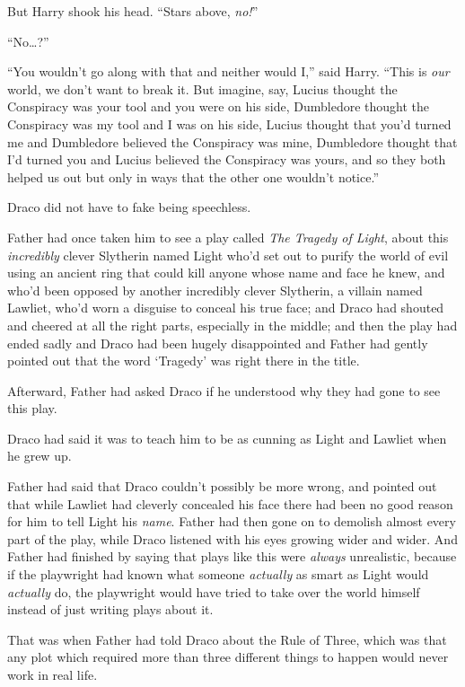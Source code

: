 But Harry shook his head. “Stars above, \emph{no!}”

“No…?”

“You wouldn’t go along with that and neither would I,” said Harry. “This is \emph{our} world, we don’t want to break it. But imagine, say, Lucius thought the Conspiracy was your tool and you were on his side, Dumbledore thought the Conspiracy was my tool and I was on his side, Lucius thought that you’d turned me and Dumbledore believed the Conspiracy was mine, Dumbledore thought that I’d turned you and Lucius believed the Conspiracy was yours, and so they both helped us out but only in ways that the other one wouldn’t notice.”

Draco did not have to fake being speechless.

Father had once taken him to see a play called \emph{The Tragedy of Light}, about this \emph{incredibly} clever Slytherin named Light who’d set out to purify the world of evil using an ancient ring that could kill anyone whose name and face he knew, and who’d been opposed by another incredibly clever Slytherin, a villain named Lawliet, who’d worn a disguise to conceal his true face; and Draco had shouted and cheered at all the right parts, especially in the middle; and then the play had ended sadly and Draco had been hugely disappointed and Father had gently pointed out that the word ‘Tragedy’ was right there in the title.

Afterward, Father had asked Draco if he understood why they had gone to see this play.

Draco had said it was to teach him to be as cunning as Light and Lawliet when he grew up.

Father had said that Draco couldn’t possibly be more wrong, and pointed out that while Lawliet had cleverly concealed his face there had been no good reason for him to tell Light his \emph{name}. Father had then gone on to demolish almost every part of the play, while Draco listened with his eyes growing wider and wider. And Father had finished by saying that plays like this were \emph{always} unrealistic, because if the playwright had known what someone \emph{actually} as smart as Light would \emph{actually} do, the playwright would have tried to take over the world himself instead of just writing plays about it.

That was when Father had told Draco about the Rule of Three, which was that any plot which required more than three different things to happen would never work in real life.

